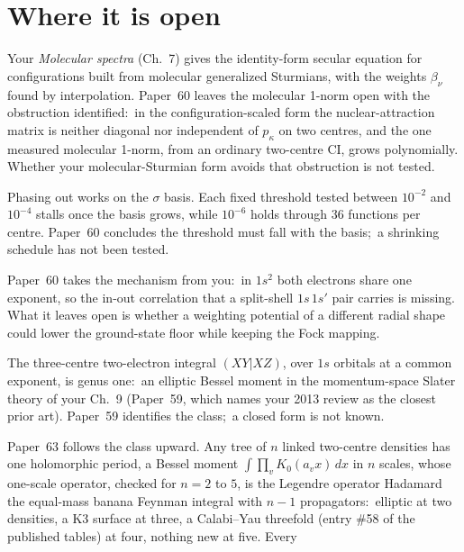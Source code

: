 \documentclass[11pt]{article}
\newcommand{\bk}[1]{\textit{#1}}
\begin{document}
\section{Where it is open}
\begin{description}[style=nextline, leftmargin=1.2em]
\item[The molecular secular equation as a quantum target.] Your
\bk{Molecular spectra} (Ch.~7) gives the identity-form secular equation for
configurations built from molecular generalized Sturmians, with the weights
$\beta_\nu$ found by interpolation. Paper~60 leaves the molecular 1-norm open
with the obstruction identified:\ in the configuration-scaled form the
nuclear-attraction matrix is neither diagonal nor independent of $p_\kappa$
on two centres, and the one measured molecular 1-norm, from an ordinary
two-centre CI, grows polynomially. Whether your molecular-Sturmian form avoids
that obstruction is not tested.
\item[A schedule for phasing out eigenvectors.] Phasing out works on the
$\sigma$ basis. Each fixed threshold tested between $10^{-2}$ and $10^{-4}$
stalls once the basis grows, while $10^{-6}$ holds through 36 functions per
centre. Paper~60 concludes the threshold must fall with the basis;\ a
shrinking schedule has not been tested.
\item[Lowering the ground-state floor.] Paper~60 takes the mechanism from
you:\ in $1s^2$ both electrons share one exponent, so the in-out correlation
that a split-shell $1s\,1s'$ pair carries is missing. What it leaves open is
whether a weighting potential of a different radial shape could lower the
ground-state floor while keeping the Fock mapping.
\item[Three centres.] The three-centre two-electron integral $(XY|XZ)$, over
$1s$ orbitals at a common exponent, is genus one:\ an elliptic Bessel moment
in the momentum-space Slater theory of your Ch.~9 (Paper~59, which names your
2013 review as the closest prior art). Paper~59 identifies the class;\ a
closed form is not known.
\item[The rungs beyond, and a question for you.] Paper~63 follows the class
upward. Any tree of $n$ linked two-centre densities has one holomorphic
period, a Bessel moment $\int\prod_v K_0(a_vx)\,dx$ in $n$ scales, whose
one-scale operator, checked for $n=2$ to $5$, is the Legendre operator
Hadamard the equal-mass banana Feynman integral with $n-1$ propagators:\
elliptic at two densities, a K3 surface at three, a Calabi--Yau threefold
(entry \#58 of the published tables) at four, nothing new at five. Every

\end{description}
\end{document}
